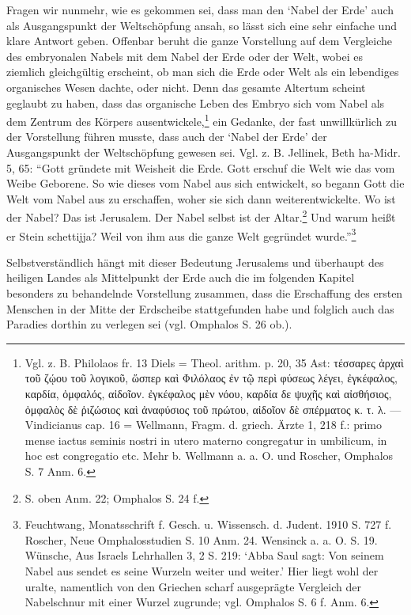 \documentclass[a4paper, 11pt, oneside]{article}
\begin{document}
Fragen wir nunmehr, wie es gekommen sei, dass man den `Nabel der Erde' auch als Ausgangspunkt der Weltschöpfung ansah, so lässt sich eine sehr einfache und klare Antwort geben. Offenbar beruht die ganze Vorstellung auf dem Vergleiche des embryonalen Nabels mit dem Nabel der Erde oder der Welt, wobei es ziemlich gleichgültig erscheint, ob man sich die Erde oder Welt als ein lebendiges organisches Wesen dachte, oder nicht. Denn das gesamte Altertum scheint geglaubt zu haben, dass das organische Leben des Embryo sich vom Nabel als dem Zentrum des Körpers ausentwickele,\footnote{Vgl. z. B. Philolaos fr. 13 Diels = Theol. arithm. p. 20, 35 Ast: τέσσαρες ἀρχαὶ τοῦ ζῴου τοῦ λογικοῦ, ὥσπερ καὶ Φιλόλαος ἐν τῷ περὶ φύσεως λέγει, ἐγκέφαλος, καρδία, ὀμφαλός, αἰδοῖον. ἐγκέφαλος μὲν νόου, καρδία δε ψυχῆς καὶ αἰσθήσιος, ὀμφαλὸς δὲ ῥιζώσιος καὶ ἀναφύσιος τοῦ πρώτου, αἰδοῖον δὲ σπέρματος κ. τ. λ. --- Vindicianus cap. 16 = Wellmann, Fragm. d. griech. Ärzte 1, 218 f.: primo mense iactus seminis nostri in utero materno congregatur in umbilicum, in hoc est congregatio etc. Mehr b. Wellmann a. a. O. und Roscher, Omphalos S. 7 Anm. 6.} ein Gedanke, der fast unwillkürlich zu der Vorstellung führen musste, dass auch der `Nabel der Erde' der Ausgangspunkt der Weltschöpfung gewesen sei. Vgl. z. B. Jellinek, Beth ha-Midr. 5, 65: "`Gott gründete mit Weisheit die Erde. Gott erschuf die Welt wie das vom Weibe Geborene. So wie dieses vom Nabel aus sich entwickelt, so begann Gott die Welt vom Nabel aus zu erschaffen, woher sie sich dann weiterentwickelte. Wo ist der Nabel? Das ist Jerusalem. Der Nabel selbst ist der Altar.\footnote{S. oben Anm. 22; Omphalos S. 24 f.} Und warum heißt er Stein schettijja? Weil von ihm aus die ganze Welt gegründet wurde."'\footnote{Feuchtwang, Monatsschrift f. Gesch. u. Wissensch. d. Judent. 1910 S. 727 f. Roscher, Neue Omphalosstudien S. 10 Anm. 24. Wensinck a. a. O. S. 19. Wünsche, Aus Israels Lehrhallen 3, 2 S. 219: `Abba Saul sagt: Von seinem Nabel aus sendet es seine Wurzeln weiter und weiter.' Hier liegt wohl der uralte, namentlich von den Griechen scharf ausgeprägte Vergleich der Nabelschnur mit einer Wurzel zugrunde; vgl. Omphalos S. 6 f. Anm. 6.}

Selbstverständlich hängt mit dieser Bedeutung Jerusalems und überhaupt des heiligen Landes als Mittelpunkt der Erde auch die im folgenden Kapitel besonders zu behandelnde Vorstellung zusammen, dass die Erschaffung des ersten Menschen in der Mitte der Erdscheibe stattgefunden habe und folglich auch das Paradies dorthin zu verlegen sei (vgl. Omphalos S. 26 ob.).
\end{document}
